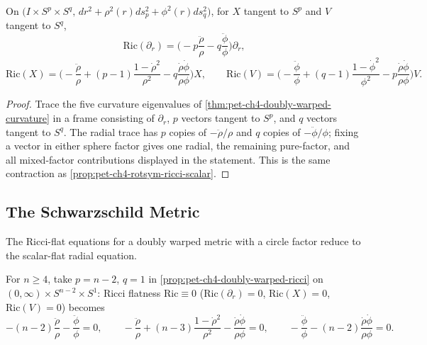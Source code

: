 \begin{proposition}
  \label{prop:pet-ch4-doubly-warped-ricci}
  On $\big(I\times S^p\times S^q,\,dr^2+\rho^2(r)ds_p^2+\phi^2(r)ds_q^2\big)$, for
  $X$ tangent to $S^p$ and $V$ tangent to $S^q$,
  \[
    \mathrm{Ric}(\partial_r)=\Big(-p\frac{\ddot\rho}\rho-q\frac{\ddot\phi}\phi\Big)\partial_r,
  \]
  \[
    \mathrm{Ric}(X)=\Big(-\frac{\ddot\rho}\rho+(p-1)\frac{1-\dot\rho^2}{\rho^2}-q\frac{\dot\rho\dot\phi}{\rho\phi}\Big)X,
    \qquad
    \mathrm{Ric}(V)=\Big(-\frac{\ddot\phi}\phi+(q-1)\frac{1-\dot\phi^2}{\phi^2}-p\frac{\dot\rho\dot\phi}{\rho\phi}\Big)V.
  \]
\end{proposition}
\begin{proof}
  \sketch
  Trace the five curvature eigenvalues of
  \cref{thm:pet-ch4-doubly-warped-curvature} in a frame consisting of
  $\partial_r$, $p$ vectors tangent to $S^p$, and $q$ vectors tangent to $S^q$.
  The radial trace has $p$ copies of $-\ddot\rho/\rho$ and $q$ copies of
  $-\ddot\phi/\phi$; fixing a vector in either sphere factor gives one radial,
  the remaining pure-factor, and all mixed-factor contributions displayed in
  the statement. This is the same contraction as
  \cref{prop:pet-ch4-rotsym-ricci-scalar}.
\end{proof}

\subsection{The Schwarzschild Metric}

The Ricci-flat equations for a doubly warped metric with a circle factor reduce to
the scalar-flat radial equation.

\begin{definition}
  \label{def:pet-ch4-schwarzschild-construction}
  \leanok
  For $n\ge4$, take $p=n-2$, $q=1$ in
  \cref{prop:pet-ch4-doubly-warped-ricci} on
  $(0,\infty)\times S^{n-2}\times S^1$: Ricci flatness $\mathrm{Ric}\equiv0$
  ($\mathrm{Ric}(\partial_r)=0$, $\mathrm{Ric}(X)=0$, $\mathrm{Ric}(V)=0$) becomes
  \[
    -(n-2)\frac{\ddot\rho}\rho-\frac{\ddot\phi}\phi=0,\qquad
    -\frac{\ddot\rho}\rho+(n-3)\frac{1-\dot\rho^2}{\rho^2}-\frac{\dot\rho\dot\phi}{\rho\phi}=0,\qquad
    -\frac{\ddot\phi}\phi-(n-2)\frac{\dot\rho\dot\phi}{\rho\phi}=0.
  \]
\end{definition}

